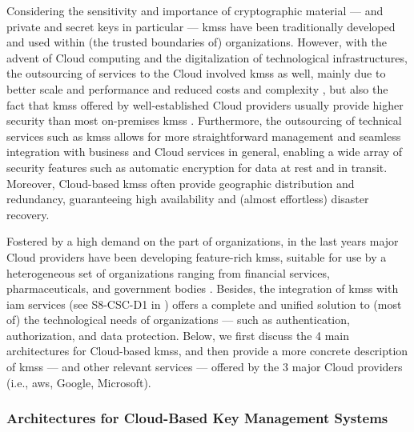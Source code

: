 Considering the sensitivity and importance of cryptographic material --- and private and secret keys in particular --- \glspl{kms} have been traditionally developed and used within (the trusted boundaries of) organizations. However, with the advent of Cloud computing and the digitalization of technological infrastructures, the outsourcing of services to the Cloud involved \glspl{kms} as well, mainly due to better scale and performance and reduced costs and complexity \cite{csa_key_2020}, but also the fact that \glspl{kms} offered by well-established Cloud providers usually provide higher security than most on-premises \glspl{kms} \cite{csa_recommendations_2021}. Furthermore, the outsourcing of technical services such as \glspl{kms} allows for more straightforward management and seamless integration with business and Cloud services in general, enabling a wide array of security features such as automatic encryption for data at rest and in transit. Moreover, Cloud-based \glspl{kms} often provide geographic distribution and redundancy, guaranteeing high availability and (almost effortless) disaster recovery.


Fostered by a high demand on the part of organizations, in the last years major Cloud providers have been developing feature-rich \glspl{kms}, suitable for use by a heterogeneous set of organizations ranging from financial services, pharmaceuticals, and government bodies \cite{csa_key_2020}. Besides, the integration of \glspl{kms} with \gls{iam} services (see S8-CSC-D1 in ) offers a complete and unified solution to (most of) the technological needs of organizations --- such as authentication, authorization, and data protection. Below, we first discuss the 4 main architectures for Cloud-based \glspl{kms}, and then provide a more concrete description of \glspl{kms} --- and other relevant services --- offered by the 3 major Cloud providers (i.e., \gls{aws}, Google, Microsoft).



\subsubsection{Architectures for Cloud-Based Key Management Systems}\label{sec:cloud:architectures}

